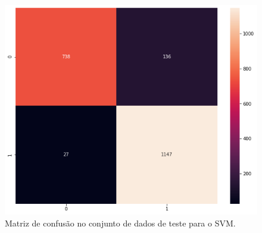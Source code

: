 \documentclass[a4paper, 12pt]{article}
\begin{document}
\begin{figure}[h]
	\centering
	\includegraphics[width=0.5\linewidth]{figuras/quest10_confusaoSVM.png}
    \caption{Matriz de confusão no conjunto de dados de teste para o SVM.}
    \label{fig:quest10_confusaoSVM}
\end{figure}
\FloatBarrier


\thispagestyle{empty}

\newpage
{}


\newpage


%
%






\newpage
\end{document}
